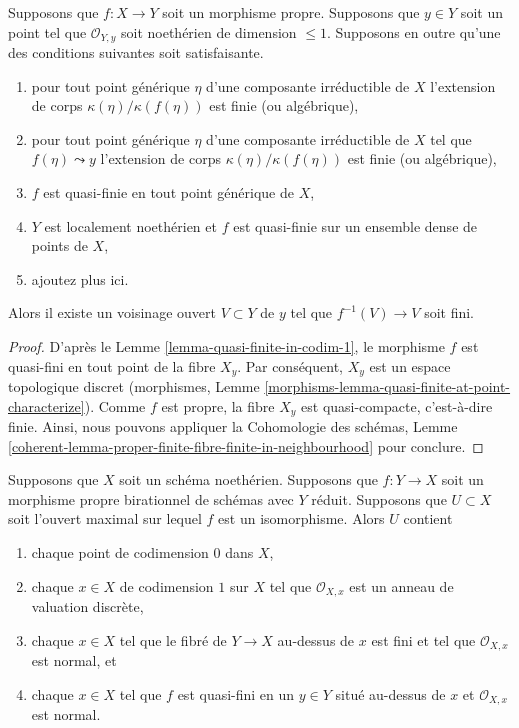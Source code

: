 \begin{lemma}
\label{lemma-finite-in-codim-1}
Supposons que $f : X \to Y$ soit un morphisme propre. Supposons que $y \in Y$
soit un point tel que $\mathcal{O}_{Y, y}$ soit noethérien de dimension
$\leq 1$. Supposons en outre qu'une des conditions suivantes soit satisfaisante.
\begin{enumerate}
\item pour tout point générique $\eta$ d'une
composante irréductible de $X$ l'extension de corps
$\kappa(\eta)/\kappa(f(\eta))$ est finie (ou
algébrique), \item pour tout point générique $\eta$
d'une composante irréductible de $X$ tel que $f(\eta)
\leadsto y$ l'extension de corps
$\kappa(\eta)/\kappa(f(\eta))$ est finie (ou algébrique),
\item $f$ est quasi-finie en tout point générique de $X$,
\item $Y$ est localement noethérien et $f$ est quasi-finie
sur un ensemble dense de points de $X$, \item ajoutez plus ici.
\end{enumerate}
Alors il existe un voisinage ouvert $V \subset
Y$ de $y$ tel que $f^{-1}(V) \to V$ soit fini.
\end{lemma}

\begin{proof}
D'après le Lemme \ref{lemma-quasi-finite-in-codim-1}, le
morphisme $f$ est quasi-fini en tout point de la fibre
$X_y$. Par conséquent, $X_y$ est un espace topologique
discret (morphismes, Lemme
\ref{morphisms-lemma-quasi-finite-at-point-characterize}). Comme $f$
est propre, la fibre $X_y$ est quasi-compacte, c'est-à-dire finie.
Ainsi, nous pouvons appliquer la Cohomologie des schémas, Lemme
\ref{coherent-lemma-proper-finite-fibre-finite-in-neighbourhood} pour conclure.
\end{proof}

\begin{lemma}
\label{lemma-modification-normal-iso-over-codimension-1}
Supposons que $X$ soit un schéma noethérien. Supposons que $f : Y \to X$ soit un
morphisme propre birationnel de schémas avec $Y$ réduit. Supposons que $U \subset
X$ soit l'ouvert maximal sur lequel $f$ est un isomorphisme. Alors $U$ contient
\begin{enumerate}
\item chaque point de codimension $0$ dans $X$, \item
chaque $x \in X$ de codimension $1$ sur $X$ tel que
$\mathcal{O}_{X, x}$ est un anneau de valuation discrète,
\item chaque $x \in X$ tel que le fibré de $Y \to X$ au-dessus
de $x$ est fini et tel que $\mathcal{O}_{X, x}$ est normal, et
\item chaque $x \in X$ tel que $f$ est quasi-fini en un $y \in
Y$ situé au-dessus de $x$ et $\mathcal{O}_{X, x}$ est normal.
\end{enumerate}
\end{lemma}

